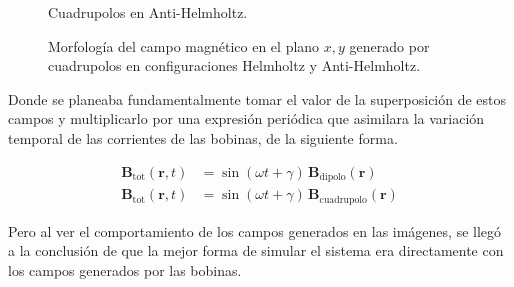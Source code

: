 \begin{figure}[H]
\begin{minipage}[b]{0.48\textwidth}
    \caption{Cuadrupolos en Anti-Helmholtz.}
    \label{fig:antihelmholtz_quadrupoles_xy_field}
  \end{minipage}
  \caption{Morfología del campo magnético en el plano $x,y$ generado por cuadrupolos en configuraciones Helmholtz y Anti-Helmholtz.}
  \label{fig:campos_cuadrupolos}
\end{figure}

Donde se planeaba fundamentalmente tomar el valor de la superposición de
estos campos y multiplicarlo por una expresión periódica que asimilara la
variación temporal de las corrientes de las bobinas, de la siguiente forma.

\begin{align*}
  \mathbf{B}_{\text{tot}}(\mathbf{r},t) &= \sin(\omega t + \gamma) \, \mathbf{B}_{\text{dipolo}}(\mathbf{r}) \\
  \mathbf{B}_{\text{tot}}(\mathbf{r},t) &= \sin(\omega t + \gamma) \, \mathbf{B}_{\text{cuadrupolo}}(\mathbf{r})
\end{align*}

Pero al ver el comportamiento de los campos generados en las imágenes, se llegó
a la conclusión de que la mejor forma de simular el sistema era directamente con
los campos generados por las bobinas.
